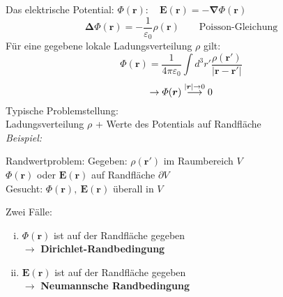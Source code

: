 \documentclass[titlepage,11pt,a4paper,ngerman]{report}
\newcommand{\tx}[1]{\textrm{#1}}
\renewcommand{\Phi}{\varPhi}
\renewcommand{\vec}[1]{\boldsymbol{#1}}
\renewcommand{\epsilon}{\varepsilon}
\newcommand{\bei}{\emph{Beispiel: }}
\begin{document}
Das elektrische Potential: $ \Phi(\vec{r}): \quad \vec{E}(\vec{r}) = - \vec{\nabla} \Phi(\vec{r}) $\\
$$ \vec{\Delta} \Phi (\vec{r}) = -\frac{1}{\epsilon_0} \rho(\vec{r})  \qquad \tx{Poisson-Gleichung}$$
Für eine gegebene lokale Ladungsverteilung $ \rho $ gilt:
\begin{equation*}
\Phi(\vec{r}) = \frac{1}{4 \pi \epsilon_0} \int d^3 r' \frac{\rho(\vec{r}')}{|\vec{r} - \vec{r}'|}
\end{equation*}
\begin{equation*}
\rightarrow \Phi(\vec{r}) \buildrel |\vec{r}| \rightarrow 0 \over \longrightarrow 0
\end{equation*}
Typische Problemstellung:\\
Ladungsverteilung $\rho$ + Werte des Potentials auf Randfläche\\[5pt]
\bei\\
\begin{minipage}{.6\linewidth}
	Randwertproblem: Gegeben: $\rho(\vec{r}')$ im Raumbereich $V$\\
	$\Phi(\vec{r})$ oder $\vec{E}(\vec{r})$ auf Randfläche $\partial V$\\
	Gesucht: $\Phi(\vec{r}),\ \vec{E}(\vec{r})$ überall in $V$
\end{minipage}
\begin{minipage}{.4\linewidth}
	\centering
\end{minipage}
Zwei Fälle:
\begin{enumerate}[i)]
	\item $ \Phi(\vec{r}) $ ist auf der Randfläche gegeben\\
	$ \rightarrow $ \textbf{Dirichlet-Randbedingung}
	\item $ \vec{E}(\vec{r}) $ ist auf der Randfläche gegeben\\
	$ \rightarrow $ \textbf{Neumannsche Randbedingung}
\end{enumerate}
\end{document}
